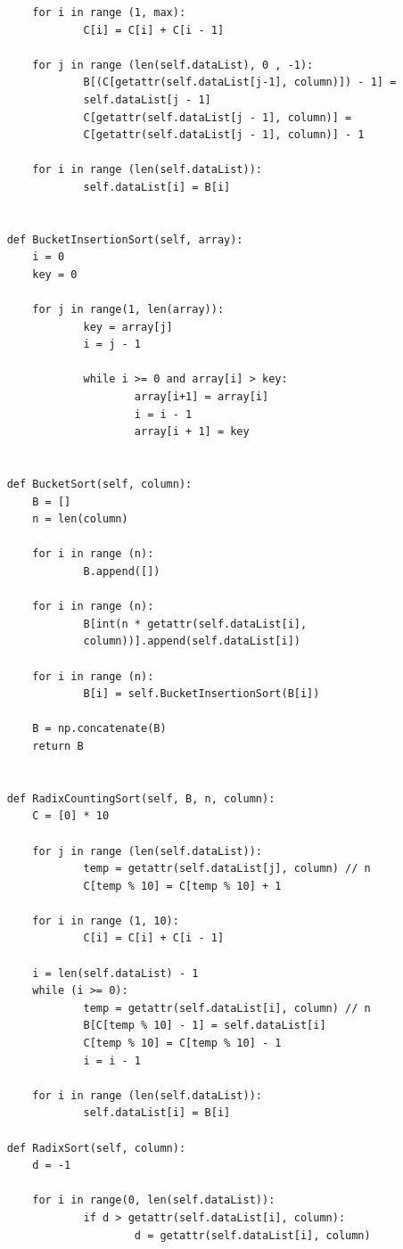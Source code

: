 \documentclass[12pt]{article}
\begin{document}
\begin{verbatim}
        for i in range (1, max):
                C[i] = C[i] + C[i - 1]

        for j in range (len(self.dataList), 0 , -1):
                B[(C[getattr(self.dataList[j-1], column)]) - 1] =
                self.dataList[j - 1]      
                C[getattr(self.dataList[j - 1], column)] =
                C[getattr(self.dataList[j - 1], column)] - 1

        for i in range (len(self.dataList)):
                self.dataList[i] = B[i]


    def BucketInsertionSort(self, array):
        i = 0
        key = 0

        for j in range(1, len(array)):
                key = array[j]
                i = j - 1
        
                while i >= 0 and array[i] > key:
                        array[i+1] = array[i]
                        i = i - 1 
                        array[i + 1] = key


    def BucketSort(self, column):
        B = []
        n = len(column)

        for i in range (n):
                B.append([])

        for i in range (n):
                B[int(n * getattr(self.dataList[i],
                column))].append(self.dataList[i])

        for i in range (n):
                B[i] = self.BucketInsertionSort(B[i])

        B = np.concatenate(B)
        return B 


    def RadixCountingSort(self, B, n, column):
        C = [0] * 10

        for j in range (len(self.dataList)):
                temp = getattr(self.dataList[j], column) // n
                C[temp % 10] = C[temp % 10] + 1

        for i in range (1, 10):
                C[i] = C[i] + C[i - 1]

        i = len(self.dataList) - 1
        while (i >= 0):
                temp = getattr(self.dataList[i], column) // n 
                B[C[temp % 10] - 1] = self.dataList[i]
                C[temp % 10] = C[temp % 10] - 1
                i = i - 1

        for i in range (len(self.dataList)):
                self.dataList[i] = B[i]

    def RadixSort(self, column):
        d = -1

        for i in range(0, len(self.dataList)):
                if d > getattr(self.dataList[i], column):
                        d = getattr(self.dataList[i], column)


\end{verbatim}
\end{document}
